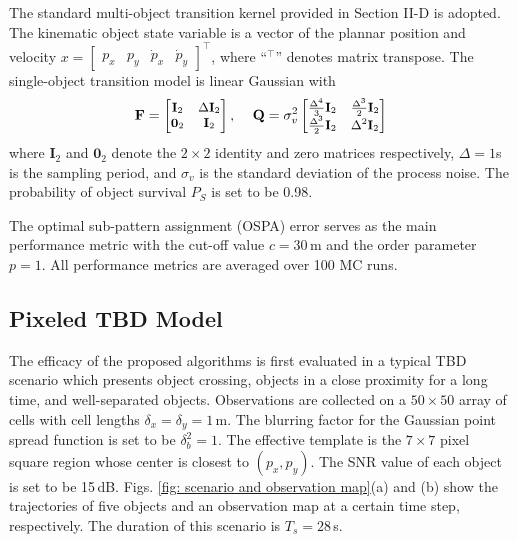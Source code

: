 \documentclass[journal]{IEEEtran}
\begin{document}
{The standard  multi-object transition kernel provided in Section II-D is adopted. The kinematic object state variable is a vector of the plannar position and velocity $x=
\begin{bmatrix}
p_{x} & p_{y} & \dot{p}_{x} & \dot{p}_{y}
\end{bmatrix}
^{\top}$, where ``$^{\top}$'' denotes matrix transpose. The single-object transition model is  linear Gaussian with
\begin{equation} \label{Gaussian-model}
{\small
\mathbf{F}=
 \begin{bmatrix}
\mathbf{I}_{2}& \Delta \mathbf{I}_{2} \\ \mathbf{0}_{2} & \mathbf{I}_{2}
 \end{bmatrix}
,\,\,\,\,\,\,\, \mathbf{Q}=\sigma_v^{2}
\begin{bmatrix}
\frac{\Delta^4}{3}\mathbf{I}_{2}& \frac{\Delta^3}{2}\mathbf{I}_{2} 
\\ 
\frac{\Delta^3}{2}\mathbf{I}_{2} & \Delta^2\mathbf{I}_{2}
\end{bmatrix}}
\end{equation}
where $\mathbf{I}_{2}$ and $\mathbf{0}_{2}$ denote the $2\times 2$ identity and zero matrices respectively,  $\Delta=1$s is the sampling period, and $\sigma_{v}$ is the standard deviation of the process noise.  The probability of object survival  $P_{S}$ is set to be 0.98. 



The optimal sub-pattern assignment (OSPA) error \cite{refr:OSPA} serves as the main performance metric with the cut-off value $c = 30$\,m and the order parameter $p = 1$. All performance metrics are averaged over 100 MC runs.
\subsection{Pixeled TBD Model}
 The  efficacy of the proposed algorithms   is  first evaluated  in a typical TBD scenario which presents object crossing, objects in a close proximity for a long time,  and  well-separated objects.  Observations are collected on a  $50\times50$ array of cells with cell lengths $\delta_x\!=\!\delta_y\!=\!1\,\text{m}$. The blurring factor for the Gaussian point spread function is set to be $\delta^2_b=1$. The effective template  is the $7\!\times\!7$ pixel  square region whose center is closest to $(p_x,p_y)$.  The SNR value of each object is set to be 15\,dB.  Figs. \ref{fig: scenario and observation map}(a) and (b) show the trajectories of five objects and an  observation map at a certain time step, respectively. 
 The duration of this scenario is  $T_s=28$\,s.
 
}
\end{document}
